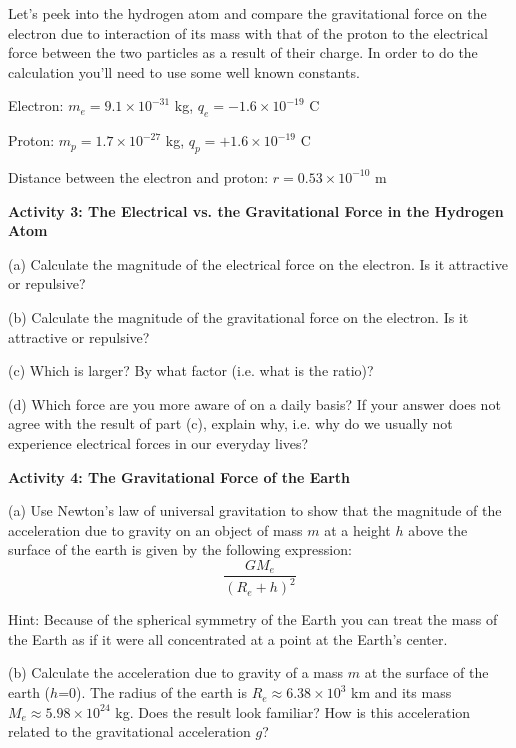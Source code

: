 Let's peek into the hydrogen atom and compare the gravitational force on the
electron due to interaction of its mass with that of the proton to the electrical
force between the two particles as a result of their charge. In order to do
the calculation you'll need to use some well known constants.

Electron: \(m_{e}  = 9.1 \times 10^{-31} \) kg, \( q_{e}  = - 1.6 
\times 10^{-19} \)
C 

Proton: \( m_{p}  = 1.7 \times 10^{-27} \) kg, \( q_{p}  = +1.6 \times 10^{-19} \)
C 

Distance between the electron and proton: \(r = 0.53 \times 10^{-10} \) m

\textbf{Activity 3: The Electrical vs. the Gravitational Force in the Hydrogen
Atom}

(a) Calculate the magnitude of the electrical force on the electron. Is it attractive
or repulsive?
\answerspace{20mm}

(b) Calculate the magnitude of the gravitational force on the electron. Is it
attractive or repulsive?
\answerspace{20mm}

(c) Which is larger? By what factor (i.e. what is the ratio)?
\answerspace{20mm}

(d) Which force are you more aware of on a daily basis? If your answer does
not agree with the result of part (c), explain why, i.e. why do we usually not 
experience electrical forces in our everyday lives?
\answerspace{20mm}

\textbf{Activity 4: The Gravitational Force of the Earth}

(a) Use Newton's law of universal gravitation to show that the magnitude of the acceleration due to gravity
on an object of mass $m$ at a height $h$ above the surface of the earth is given by
the following expression:
\[
\frac{GM_{e}}{\left( R_{e}+h\right) ^{2}}\]

Hint: Because of the spherical symmetry of the Earth you can treat the mass
of the Earth as if it were all concentrated at a point at the Earth's center.
\answerspace{20mm}
\pagebreak

(b) Calculate the acceleration due to gravity of a mass $m$ at the surface of
the earth ($h$=0). The radius of the earth is \( R_{e}  \approx   6.38
\times 10^{3} \) km and its mass \( M_{e}  \approx  5.98 \times 10^{24} \)
kg. Does the result look familiar? How is this acceleration related to the gravitational
acceleration $g$?
\vspace{40mm}

